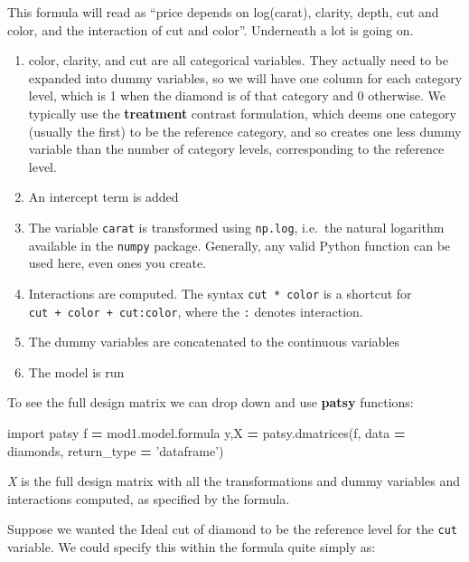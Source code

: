 \documentclass[
  letterpaper,
]{scrbook}
\newenvironment{Shaded}{\begin{snugshade}}{\end{snugshade}}
\newcommand{\ImportTok}[1]{#1}
\newcommand{\NormalTok}[1]{#1}
\newcommand{\OperatorTok}[1]{\textcolor[rgb]{0.81,0.36,0.00}{\textbf{#1}}}
\newcommand{\StringTok}[1]{\textcolor[rgb]{0.31,0.60,0.02}{#1}}
\providecommand{\tightlist}{%
  \setlength{\itemsep}{0pt}\setlength{\parskip}{0pt}}
\begin{document}
This formula will read as
``price depends on log(carat), clarity, depth, cut and color, and the interaction of cut and color''. Underneath a lot is going on.

\begin{enumerate}
\def\labelenumi{\arabic{enumi}.}
\tightlist
\item
  color, clarity, and cut are all categorical variables. They actually need to be expanded into dummy variables, so we will have one column for each category level, which is 1 when the diamond is of that category and 0 otherwise. We typically use the \textbf{treatment} contrast formulation, which deems one category (usually the first) to be the reference category, and so creates one less dummy variable than the number of category levels, corresponding to the reference level.
\item
  An intercept term is added
\item
  The variable \texttt{carat} is transformed using \texttt{np.log}, i.e.~the natural logarithm available in the \texttt{numpy} package. Generally, any valid Python function can be used here, even ones you create.
\item
  Interactions are computed. The syntax \texttt{cut\ *\ color} is a shortcut for \texttt{cut\ +\ color\ +\ cut:color}, where the \texttt{:} denotes interaction.
\item
  The dummy variables are concatenated to the continuous variables
\item
  The model is run
\end{enumerate}

To see the full design matrix we can drop down and use \textbf{patsy} functions:

\begin{Shaded}
\begin{Highlighting}[]
\ImportTok{import}\NormalTok{ patsy}
\NormalTok{f }\OperatorTok{=}\NormalTok{ mod1.model.formula}
\NormalTok{y,X }\OperatorTok{=}\NormalTok{ patsy.dmatrices(f, data }\OperatorTok{=}\NormalTok{ diamonds, return_type }\OperatorTok{=} \StringTok{'dataframe'}\NormalTok{)}
\end{Highlighting}
\end{Shaded}

\emph{X} is the full design matrix with all the transformations and dummy variables and interactions computed, as specified by the formula.

Suppose we wanted the Ideal cut of diamond to be the reference level for the \texttt{cut} variable. We could specify this within the formula quite simply as:
\end{document}
